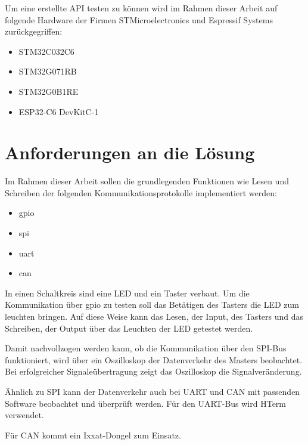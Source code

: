Um eine erstellte API testen zu können wird im Rahmen dieser Arbeit auf folgende Hardware der Firmen STMicroelectronics und Espressif Systems zurückgegriffen:
\begin{itemize}
	\item STM32C032C6
	\item STM32G071RB
	\item STM32G0B1RE
	\item ESP32-C6 DevKitC-1
\end{itemize}


\section{Anforderungen an die Lösung}
Im Rahmen dieser Arbeit sollen die grundlegenden Funktionen wie Lesen und Schreiben der folgenden Kommunikationsprotokolle implementiert werden:
\begin{itemize}
	\item \gls{gpio}
	\item \gls{spi}
	\item \gls{uart}
	\item \gls{can}
\end{itemize}

In einen Schaltkreis sind eine LED und ein Taster verbaut. 
Um die Kommunikation über \gls{gpio} zu testen soll das Betätigen des Tasters die LED zum leuchten bringen.
Auf diese Weise kann das Lesen, der Input, des Tasters und das Schreiben, der Output über das Leuchten der LED getestet werden.

Damit nachvollzogen werden kann, ob die Kommunikation über den SPI-Bus funktioniert, 
wird über ein Oszilloskop der Datenverkehr des Masters beobachtet. 
Bei erfolgreicher Signaleübertragung zeigt das Oszilloskop die Signalveränderung.

Ähnlich zu SPI kann der Datenverkehr auch bei UART und CAN mit passenden Software beobachtet und überprüft werden.
Für den UART-Bus wird HTerm verwendet. %

Für CAN kommt ein Ixxat-Dongel zum Einsatz. %



























